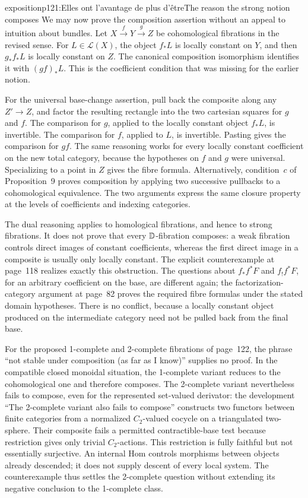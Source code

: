 \begin{dcomment}{exposition}{p121:Elles ont l'avantage de plus d'être}{The reason the strong notion composes}
We may now prove the composition assertion without an appeal to intuition about bundles. Let $X\xrightarrow{f}Y\xrightarrow{g}Z$ be cohomological fibrations in the revised sense. For $L\in\mathcal L(X)$, the object $f_*L$ is locally constant on $Y$, and then $g_*f_*L$ is locally constant on $Z$. The canonical composition isomorphism identifies it with $(gf)_*L$. This is the coefficient condition that was missing for the earlier notion.

For the universal base-change assertion, pull back the composite along any $Z'\to Z$, and factor the resulting rectangle into the two cartesian squares for $g$ and $f$. The comparison for $g$, applied to the locally constant object $f_*L$, is invertible. The comparison for $f$, applied to $L$, is invertible. Pasting gives the comparison for $gf$. The same reasoning works for every locally constant coefficient on the new total category, because the hypotheses on $f$ and $g$ were universal. Specializing to a point in $Z$ gives the fibre formula. Alternatively, condition~$c$ of Proposition~9 proves composition by applying two successive pullbacks to a cohomological equivalence. The two arguments express the same closure property at the levels of coefficients and indexing categories.

The dual reasoning applies to homological fibrations, and hence to strong fibrations. It does not prove that every $\mathbb{D}$-fibration composes: a weak fibration controls direct images of constant coefficients, whereas the first direct image in a composite is usually only locally constant. The explicit counterexample at page~118 realizes exactly this obstruction. The questions about $f_*f^*F$ and $f_!f^*F$, for an arbitrary coefficient on the base, are different again; the factorization-category argument at page~82 proves the required fibre formulas under the stated domain hypotheses. There is no conflict, because a locally constant object produced on the intermediate category need not be pulled back from the final base.

For the proposed 1-complete and 2-complete fibrations of page~122, the phrase ``not stable under composition (as far as I know)'' supplies no proof. In the compatible closed monoidal situation, the 1-complete variant reduces to the cohomological one and therefore composes. The 2-complete variant nevertheless fails to compose, even for the represented set-valued derivator: the development ``The 2-complete variant also fails to compose'' constructs two functors between finite categories from a normalized $C_2$-valued cocycle on a triangulated two-sphere. Their composite fails a permitted contractible-base test because restriction gives only trivial $C_2$-actions. This restriction is fully faithful but not essentially surjective. An internal Hom controls morphisms between objects already descended; it does not supply descent of every local system. The counterexample thus settles the 2-complete question without extending its negative conclusion to the 1-complete class.
\end{dcomment}


